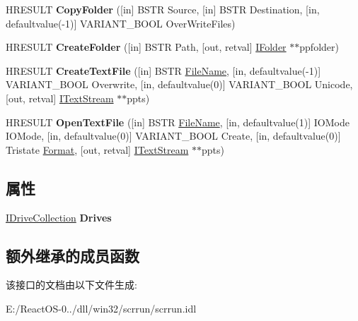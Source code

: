 \begin{DoxyCompactItemize}
H\+R\+E\+S\+U\+LT {\bfseries Copy\+Folder} (\mbox{[}in\mbox{]} B\+S\+TR Source, \mbox{[}in\mbox{]} B\+S\+TR Destination, \mbox{[}in, defaultvalue(-\/1)\mbox{]} V\+A\+R\+I\+A\+N\+T\+\_\+\+B\+O\+OL Over\+Write\+Files)
\item 
\mbox{\label{interface_scripting_1_1_i_file_system_a775f88e8a8d1df7f02dec16cdf892413}} 
H\+R\+E\+S\+U\+LT {\bfseries Create\+Folder} (\mbox{[}in\mbox{]} B\+S\+TR Path, \mbox{[}out, retval\mbox{]} \hyperlink{interface_scripting_1_1_i_folder}{I\+Folder} $\ast$$\ast$ppfolder)
\item 
\mbox{\label{interface_scripting_1_1_i_file_system_aa774c65490f7fd53ed82b85314fc0cc2}} 
H\+R\+E\+S\+U\+LT {\bfseries Create\+Text\+File} (\mbox{[}in\mbox{]} B\+S\+TR \hyperlink{struct___file_name}{File\+Name}, \mbox{[}in, defaultvalue(-\/1)\mbox{]} V\+A\+R\+I\+A\+N\+T\+\_\+\+B\+O\+OL Overwrite, \mbox{[}in, defaultvalue(0)\mbox{]} V\+A\+R\+I\+A\+N\+T\+\_\+\+B\+O\+OL Unicode, \mbox{[}out, retval\mbox{]} \hyperlink{interface_scripting_1_1_i_text_stream}{I\+Text\+Stream} $\ast$$\ast$ppts)
\item 
\mbox{\label{interface_scripting_1_1_i_file_system_abcf4d498501b43ac669043eeaee29468}} 
H\+R\+E\+S\+U\+LT {\bfseries Open\+Text\+File} (\mbox{[}in\mbox{]} B\+S\+TR \hyperlink{struct___file_name}{File\+Name}, \mbox{[}in, defaultvalue(1)\mbox{]} I\+O\+Mode I\+O\+Mode, \mbox{[}in, defaultvalue(0)\mbox{]} V\+A\+R\+I\+A\+N\+T\+\_\+\+B\+O\+OL Create, \mbox{[}in, defaultvalue(0)\mbox{]} Tristate \hyperlink{struct_format}{Format}, \mbox{[}out, retval\mbox{]} \hyperlink{interface_scripting_1_1_i_text_stream}{I\+Text\+Stream} $\ast$$\ast$ppts)
\end{DoxyCompactItemize}
\subsection*{属性}
\begin{DoxyCompactItemize}
\item 
\mbox{\label{interface_scripting_1_1_i_file_system_a5301e09d3784018b1aea750a9fa5b189}} 
\hyperlink{interface_scripting_1_1_i_drive_collection}{I\+Drive\+Collection} {\bfseries Drives}
\end{DoxyCompactItemize}
\subsection*{额外继承的成员函数}


该接口的文档由以下文件生成\+:\begin{DoxyCompactItemize}
\item 
E\+:/\+React\+O\+S-\/0../dll/win32/scrrun/scrrun.\+idl\end{DoxyCompactItemize}
